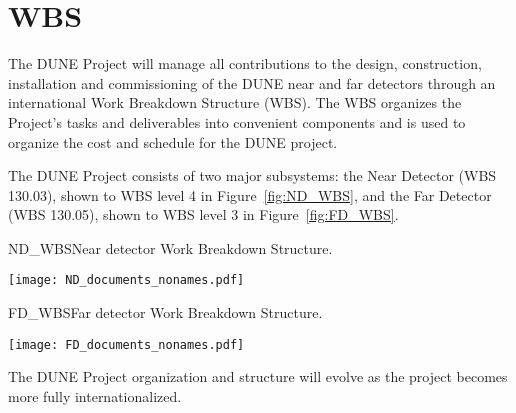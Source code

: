 \section[Work Breakdown Structure (WBS)]{WBS}

The DUNE Project will manage all contributions to the design,
construction, installation and commissioning of the DUNE near and far
detectors through an international Work Breakdown Structure (WBS).
The WBS organizes the Project's tasks and deliverables into convenient
components and is used to organize the cost and schedule for the DUNE
project.

The DUNE Project consists of two major subsystems: the Near Detector
(WBS 130.03), shown to WBS level 4 in Figure~\ref{fig:ND_WBS}, and the
Far Detector (WBS 130.05), shown to WBS level 3 in
Figure~\ref{fig:FD_WBS}.
\begin{cdrfigure}{ND_WBS}{Near detector Work Breakdown Structure.}
\centering
\begin{center}
\texttt{[image: ND\_documents\_nonames.pdf]}
\end{center}
\end{cdrfigure}
\begin{cdrfigure}{FD_WBS}{Far detector Work Breakdown Structure.}
\centering
\begin{center}
\texttt{[image: FD\_documents\_nonames.pdf]}
\end{center}
\end{cdrfigure}
The DUNE Project organization and structure will evolve as the project
becomes more fully internationalized.
